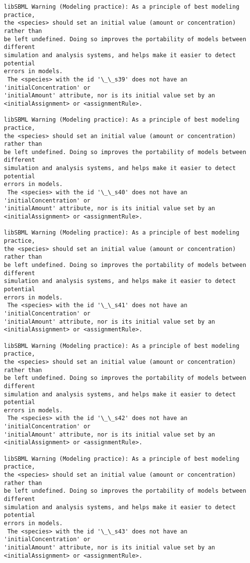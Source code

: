 \documentclass[11pt]{article}
\begin{document}
\begin{Verbatim}[commandchars=\\\{\}]
libSBML Warning (Modeling practice): As a principle of best modeling practice,
the <species> should set an initial value (amount or concentration) rather than
be left undefined. Doing so improves the portability of models between different
simulation and analysis systems, and helps make it easier to detect potential
errors in models.
 The <species> with the id '\_\_s39' does not have an 'initialConcentration' or
'initialAmount' attribute, nor is its initial value set by an
<initialAssignment> or <assignmentRule>.

libSBML Warning (Modeling practice): As a principle of best modeling practice,
the <species> should set an initial value (amount or concentration) rather than
be left undefined. Doing so improves the portability of models between different
simulation and analysis systems, and helps make it easier to detect potential
errors in models.
 The <species> with the id '\_\_s40' does not have an 'initialConcentration' or
'initialAmount' attribute, nor is its initial value set by an
<initialAssignment> or <assignmentRule>.

libSBML Warning (Modeling practice): As a principle of best modeling practice,
the <species> should set an initial value (amount or concentration) rather than
be left undefined. Doing so improves the portability of models between different
simulation and analysis systems, and helps make it easier to detect potential
errors in models.
 The <species> with the id '\_\_s41' does not have an 'initialConcentration' or
'initialAmount' attribute, nor is its initial value set by an
<initialAssignment> or <assignmentRule>.

libSBML Warning (Modeling practice): As a principle of best modeling practice,
the <species> should set an initial value (amount or concentration) rather than
be left undefined. Doing so improves the portability of models between different
simulation and analysis systems, and helps make it easier to detect potential
errors in models.
 The <species> with the id '\_\_s42' does not have an 'initialConcentration' or
'initialAmount' attribute, nor is its initial value set by an
<initialAssignment> or <assignmentRule>.

libSBML Warning (Modeling practice): As a principle of best modeling practice,
the <species> should set an initial value (amount or concentration) rather than
be left undefined. Doing so improves the portability of models between different
simulation and analysis systems, and helps make it easier to detect potential
errors in models.
 The <species> with the id '\_\_s43' does not have an 'initialConcentration' or
'initialAmount' attribute, nor is its initial value set by an
<initialAssignment> or <assignmentRule>.


\end{Verbatim}
\end{document}
